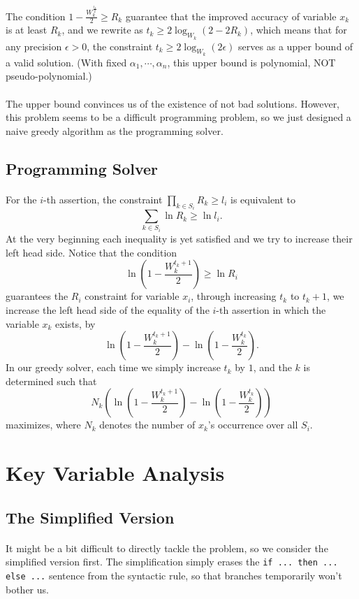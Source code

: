 \documentclass[a4paper]{article}
\begin{document}
\paragraph{}
The condition $1-\frac{W^{\frac{t_k}{2}}_k}{2}\ge R_k$ guarantee that the improved accuracy of variable $x_k$ is at least $R_k$, and we rewrite as $t_k\ge 2\log_{W_k}(2-2R_k)$, which means that for any precision $\epsilon>0$, the constraint $t_k\ge 2\log_{W_k}(2\epsilon)$ serves as a upper bound of a valid solution. (With fixed $\alpha_1,\cdots,\alpha_n$, this upper bound is polynomial, NOT pseudo-polynomial.)
\paragraph{}
The upper bound convinces us of the existence of not bad solutions. However, this problem seems to be a difficult programming problem, so we just designed a naive greedy algorithm as the programming solver.
\subsection{Programming Solver}
\paragraph{}
For the $i$-th assertion, the constraint $\prod\limits_{k\in S_i}R_k\ge l_i$ is equivalent to $$\sum_{k\in S_i}\ln R_k\ge \ln l_i.$$ At the very beginning each inequality is yet satisfied and we try to increase their left head side. Notice that the condition $$\ln(1-\frac{W^{t_k+1}_k}{2})\ge \ln R_i$$ guarantees the $R_i$ constraint for variable $x_i$, through increasing $t_k$ to $t_k+1$, we increase the left head side of the equality of the $i$-th assertion in which the variable $x_k$ exists, by $$\ln(1-\frac{W^{t_k+1}_k}{2})-\ln(1-\frac{W^{t_k}_k}{2}).$$ In our greedy solver, each time we simply increase $t_k$ by $1$, and the $k$ is determined such that $$N_k(\ln(1-\frac{W^{t_k+1}_k}{2})-\ln(1-\frac{W^{t_k}_k}{2}))$$maximizes, where $N_k$ denotes the number of $x_k$'s occurrence over all $S_i$.
\section{Key Variable Analysis}
\subsection{The Simplified Version}
\paragraph{}
It might be a bit difficult to directly tackle the problem, so we consider the simplified version first. The simplification simply erases the \texttt{if ... then ... else ...} sentence from the syntactic rule, so that branches temporarily won't bother us.
\end{document}
